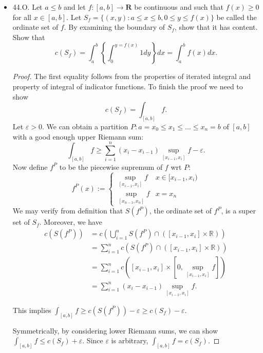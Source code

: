 \begin{itemize}
\begin{proof}
	Similarly, $\int _A M g \ge  \int _A f g$.

	By IVT, it suffices to show that $\int_A c g$ is continuous function of the real variable  $c$. But this is true by linearity of integral:
	\[
		\int_A (c+h) g - \int_A c g = h \int_A g \to  0 \qquad \text{ as } h\to 0
	.\] 
\end{proof}

\item 44.O. Let $a \leq b$ and let $f:[a, b] \rightarrow \boldsymbol{R}$ be continuous and such that $f(x) \geq 0$ for all $x \in[a, b]$. Let $S_f=\{(x, y): a \leq x \leq b, 0 \leq y \leq f(x)\}$ be called the ordinate set of $f$. By examining the boundary of $S_f$, show that it has content. Show that
\[
c\left(S_f\right)=\int_a^b\left\{\int_0^{y=f(x)} 1 d y\right\} d x=\int_a^b f(x) d x .
\]
\begin{proof}
	The first equality follows from the properties of iterated integral and property of integral of indicator functions. To finish the proof we need to show
	\[
		c(S_f) = \int _{[a,b]}f
	.\] 
	Let $\varepsilon>0$. We can obtain a partition $P: a = x_0 \le x_1 \le \ldots \le x_n = b$ of $[a,b]$ with a good enough upper Riemann sum:
	 \[
		 \int _{[a,b]}f \ge \sum_{i=1}^{n} (x_i - x_{i-1}) \sup _{[x_{i-1}, x_i]}f  - \varepsilon
	.\] 
	Now define $f^P$ to be the piecewise supremum of  $f$ wrt $P$:
	 \[
		 f^P(x):= \begin{cases}
		 \sup _{[x_{i-1}, x_i]}f & x \in [x_{i-1}, x_i) \\
		 \sup _{[x_{n-1}, x_n]}f & x = x_n
	 \end{cases}
 \]
	We may verify from definition that $S(f^P)$, the ordinate set of $f^P$, is a super set of $S_f$. Moreover, we have
	\begin{align*}
		c(S(f^P)) &=  c\left(\bigcup_{i = 1}^n  S(f^P) \cap \left( [x_{i-1}, x_{i}] \times \mathbb{R} \right)  \right) \\
		 &= \sum_{i=1}^{n} c\left( S(f^P) \cap \left( [x_{i-1}, x_{i}] \times \mathbb{R} \right)  \right) \\
			  &= \sum_{i=1}^{n} c\left( [x_{i-1}, x_i] \times \left[0,\sup_{[x_{i-1}, x_i]}f\right] \right)  \\
			  &= \sum_{i=1}^{n} (x_i - x_{i-1}) \sup_{[x_{i-1}, x_i]}f
	.\end{align*} 

	This implies $\int_{[a,b]}f \ge  c(S(f^P)) - \varepsilon \ge c(S_f) - \varepsilon$.

	Symmetrically, by considering lower Riemann sums, we can show $\int _{[a,b]}f \le c(S_f) + \varepsilon$. Since $\varepsilon$ is arbitrary, $\int _{[a,b]}f = c(S_f)$.


\end{proof}
\end{itemize}
